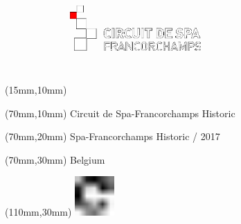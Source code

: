 \null\newpage
\begin{textblock*}{50mm}(15mm,10mm)%
\includegraphics[width=50mm]{LG/SPA.png}
\end{textblock*}
\begin{textblock*}{130mm}(70mm,10mm)%
{\fontsize{20}{20}\selectfont Circuit de Spa-Francorchamps Historic}\\
\end{textblock*}
\begin{textblock*}{120mm}(70mm,20mm)%
{\fontsize{16}{16}\selectfont Spa-Francorchamps Historic / 2017}\\
\end{textblock*}
\begin{textblock*}{120mm}(70mm,30mm)%
{\fontsize{12}{12}\selectfont Belgium}
\end{textblock*}
\begin{textblock*}{30mm}(110mm,30mm)%
\centering
\includegraphics[height=15mm]{icons/fa-rotate-right.pdf}
\end{textblock*}
